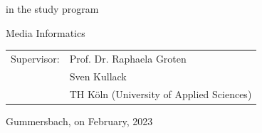 \begin{titlepage}
\begin{center}
\begin{Large}
\begin{normalsize}
in the study program\\ 
\end{normalsize}
\vspace{0.1cm}
Media Informatics\\
\end{Large}
\vspace{1.2cm}

\begin{tabular}{rl}
	Supervisor: &  Prof. Dr. Raphaela Groten\\
				&  Sven Kullack\\
				&  \small TH Köln (University of Applied Sciences) \\
\end{tabular}
\vspace{1.2cm}

\begin{normalsize}
Gummersbach, on February, 2023
\end{normalsize}

\end{center}

\end{titlepage}